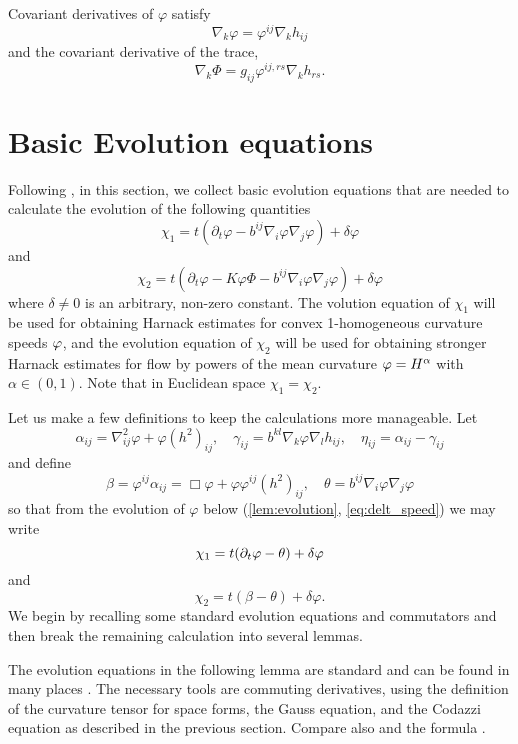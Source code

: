 \documentclass{amsart}
\begin{document}
Covariant derivatives of \(\varphi\) satisfy
\begin{equation}
\label{eq:delphi}
\nabla_k \varphi = \varphi^{ij} \nabla_k h_{ij}
\end{equation}
and the covariant derivative of the trace,
\begin{equation}
\label{eq:delPhi}
\nabla_k \Phi = g_{ij} \varphi^{ij,rs} \nabla_k h_{rs}.
\end{equation}

\section{Basic Evolution equations}

Following \cite{MR1296393, MR1100812, MR1316556, MR1480081}, in this section, we collect basic evolution equations that are needed to calculate the evolution of the following quantities
\[
\chi_1 =t(\partial_t \varphi- b^{ij} \nabla_i \varphi \nabla_j \varphi) +\delta\varphi
\]
and
\[
\chi_2 =t(\partial_t \varphi - K \varphi \Phi - b^{ij} \nabla_i \varphi \nabla_j \varphi) +\delta\varphi
\]
where \(\delta \ne 0\) is an arbitrary, non-zero constant. The volution equation of $\chi_1$ will be used for obtaining Harnack estimates for convex 1-homogeneous curvature speeds $\varphi$, and the evolution equation of $\chi_2$ will be used for obtaining stronger Harnack estimates for flow by powers of the mean curvature $\varphi=H^{\alpha}$ with $\alpha\in(0,1).$ Note that in Euclidean space $\chi_1=\chi_2.$

Let us make a few definitions to keep the calculations more manageable. Let
\[
\alpha_{ij} = \nabla^2_{ij} \varphi + \varphi(h^2)_{ij}, \quad \gamma_{ij} = b^{kl} \nabla_k \varphi \nabla_l h_{ij}, \quad \eta_{ij} = \alpha_{ij} - \gamma_{ij}
\]
and define
\[
\beta = \varphi^{ij} \alpha_{ij} = \Box\varphi + \varphi \varphi^{ij}(h^2)_{ij}, \quad \theta =  b^{ij} \nabla_i \varphi \nabla_j \varphi
\]
so that from the evolution of \(\varphi\) below (\cref{lem:evolution}, \cref{eq:delt_speed}) we may write
\[
\chi_1 = t(\partial_t\varphi- \theta) + \delta\varphi
\]
and
\[
\chi_2 = t(\beta - \theta) + \delta\varphi.
\]
We begin by recalling some standard evolution equations and commutators and then break the remaining calculation into several lemmas.

The evolution equations in the following lemma are standard and can be found in many places \cite{MR1296393,MR1100812, MR1316556, MR892052, MR1480081}. The necessary tools are commuting derivatives, using the definition of the curvature tensor for space forms, the Gauss equation, and the Codazzi equation as described in the previous section. Compare also \cite[p.~94-95]{Gerhardt:/2006} and the formula \cite[eq.~(6.17)]{Gerhardt:01/1996}.
\end{document}
